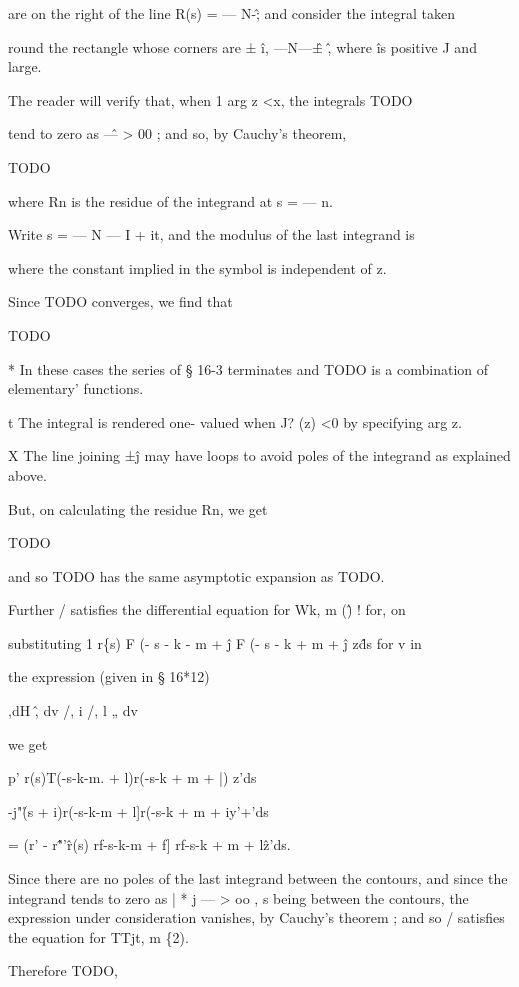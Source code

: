 are on the right of the line R(s) = — N-\^; and consider the integral
taken

round the rectangle whose corners are ± \^i, —N—\^± \^, where \^ is
positive J and large.

The reader will verify that, when 1 arg z <x, the integrals TODO

tend to zero as \^— > 00 ; and so, by Cauchy's theorem,

TODO

where Rn is the residue of the integrand at s = — n.

Write s = — N — I + it, and the modulus of the last integrand is

where the constant implied in the symbol is independent of z.

Since TODO converges, we find that

TODO

* In these cases the series of § 16-3 terminates and TODO is a
combination of elementary' functions.

t The integral is rendered one- valued when J? (z) <0 by specifying
arg z.

X The line joining ±\^j may have loops to avoid poles of the integrand
as explained above.


%
%
But, on calculating the residue Rn, we get

TODO

and so TODO has the same asymptotic expansion as TODO.

Further / satisfies the differential equation for Wk, m (\^) ! for, on

substituting 1 r\{s) F (- s - k - m + \^j F (- s - k + m + \^j z\^ds
for v in

the expression (given in § 16*12)

,dH \^, dv /, i /, l „ dv

we get

p' r(s)T(-s-k-m. + l)r(-s-k + m + |) z'ds

-j"\r(s + i)r(-s-k-m + l]r(-s-k + m + iy'+'ds

= (r' - r\^"'\^ r(s) rf-s-k-m + f] rf-s-k + m + l\^z'ds.

Since there are no poles of the last integrand between the contours,
and since the integrand tends to zero as | * j — > oo , s being
between the contours, the expression under consideration vanishes, by
Cauchy's theorem ; and so / satisfies the equation for TTjt, m \{2).

Therefore TODO,

